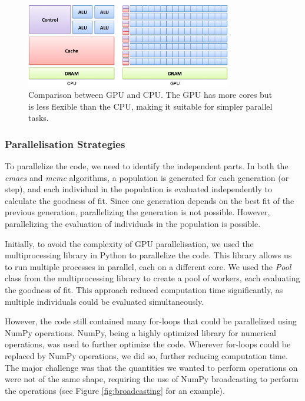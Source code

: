 \begin{figure}[h]
    \centering
    \includegraphics[width=0.8\textwidth]{images/gpu_vs_cpu.png}
    \caption{Comparison between GPU and CPU. The GPU has more cores but is less flexible than the CPU, making it suitable for simpler parallel tasks. \cite{gpu_vs_cpu}}
\end{figure}

\subsubsection{Parallelisation Strategies}

To parallelize the code, we need to identify the independent parts. In both the \textit{cmaes} and \textit{mcmc} algorithms, a population is generated 
for each generation (or step), and each individual in the population is evaluated independently to calculate the goodness of fit. Since one generation 
depends on the best fit of the previous generation, parallelizing the generation is not possible. However, parallelizing the evaluation of individuals 
in the population is possible.

\medskip

Initially, to avoid the complexity of GPU parallelisation, we used the multiprocessing library in Python to parallelize the code. This library allows 
us to run multiple processes in parallel, each on a different core. We used the \textit{Pool} class from the multiprocessing library to create a pool 
of workers, each evaluating the goodness of fit. This approach reduced computation time significantly, as multiple individuals could be evaluated simultaneously.

\medskip

However, the code still contained many for-loops that could be parallelized using NumPy operations. NumPy, being a highly optimized library for numerical 
operations, was used to further optimize the code. Wherever for-loops could be replaced by NumPy operations, we did so, further reducing computation time. 
The major challenge was that the quantities we wanted to perform operations on were not of the same shape, requiring the use of NumPy broadcasting to 
perform the operations (see Figure \ref{fig:broadcasting} for an example).

